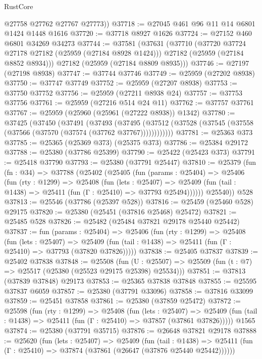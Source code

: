 \begin{lexlean}{RustCore}
\begin{coremodule}
        @27758
        @27762
        @27767
        @27773))
@37718 := @27045 @461 @96 @11 @14 @6801 @1424 @1448 @1616
@37720 := @37718 @8927 @1626
@37724 := @27152 @460 @6801 @34269 @34273
@37744 := @37581
    (@37631
      (@37710
        (@37720 @37724 @27178 @27182 (@25959 (@27184 @8928 @1424)))
        @27182
        (@25959 (@27184 @8852 @8934)))
      @27182
      (@25959 (@27184 @8809 @8935)))
@37746 := @27197 (@27198 @8938)
@37747 := @37744 @37746
@37749 := @25959 (@27202 @8938)
@37750 := @37747 @37749
@37752 := @25959 (@27207 @8938)
@37753 := @37750 @37752
@37756 := @25959 (@27211 @8938 @24)
@37757 := @37753 @37756
@37761 := @25959 (@27216 @514 @24 @11)
@37762 := @37757 @37761
@37767 := @25959 (@25960 (@25961 (@27222 @8938)) @1342)
@37780 := @37425
    (@37450
      (@37491
        (@37493
          (@37495 (@37512 (@37528 (@37545 (@37558 (@37566 (@37570 (@37574 (@37762 @37767))))))))))))
@37781 := @25363 @373
@37785 := @25365 (@25369 @373) (@25375 @373)
@37786 := @25384 @29172
@37788 := @25380 (@37786 @25399)
@37790 := @25422 (@25423 @373)
@37791 := @25418 @37790
@37793 := @25380 (@37791 @25447)
@37810 := @25379
    (fun (fn : @34) =>
    @37788
      (@25402
        (@25405
          (fun (params : @25404) =>
          @25406
            (fun (rty : @1299) =>
            @25408
              (fun (lets : @25407) =>
              @25409 (fun (tail : @1438) => @25411 (fun (Γ : @25410) => @37793 @25494))))))
        @25540))
    @528
@37813 := @25546 (@37786 (@25397 @528))
@37816 := @25459 (@25460 @528) @29175
@37820 := @25380 (@25451 (@37816 @25468) @25472)
@37821 := @25485 @528
@37826 := @25482 (@25484 @37821 @29178 @25440 @25442)
@37837 := fun (params : @25404) =>
  @25406
    (fun (rty : @1299) =>
    @25408
      (fun (lets : @25407) =>
      @25409 (fun (tail : @1438) => @25411 (fun (Γ : @25410) => @37793 (@37820 @37826)))))
@37838 := @25405 @37837
@37839 := @25402 @37838
@37848 := @25508
    (fun (U : @25507) => @25509 (fun (t : @7) => @25517 (@25380 (@25523 @29175 @25398) @25534)))
@37851 := @37813 (@37839 @37848) @29173
@37853 := @25365 @37838 @37848
@37855 := @25595 @37837 @6059
@37857 := @25380 (@37791 @33096)
@37858 := @37816 @33099
@37859 := @25451 @37858
@37861 := @25380 (@37859 @25472)
@37872 := @25598
    (fun (rty : @1299) =>
    @25408
      (fun (lets : @25407) =>
      @25409 (fun (tail : @1438) => @25411 (fun (Γ : @25410) => @37857 (@37861 @37826)))))
    @1565
@37874 := @25380 (@37791 @35715)
@37876 := @26648 @37821 @29178
@37888 := @25620
    (fun (lets : @25407) =>
    @25409
      (fun (tail : @1438) =>
      @25411 (fun (Γ : @25410) => @37874 (@37861 (@26647 (@37876 @25440 @25442))))))

\end{coremodule}
\end{lexlean}
